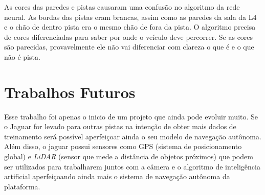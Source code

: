 As cores das paredes e pistas causaram uma confusão no algoritmo da rede neural. As bordas das pistas eram brancas, assim como as paredes da sala da L4 e o chão de dentro pista era o mesmo chão de fora da pista. O algoritmo precisa de cores diferenciadas para saber por onde o veículo deve percorrer. Se as cores são parecidas, provavelmente ele não vai diferenciar com clareza o que é e o que não é pista.

\section{Trabalhos Futuros}
\label{sec:trabalhos-futuros}

Esse trabalho foi apenas o inicio de um projeto que ainda pode evoluir muito. Se o Jaguar for levado para outras pistas na intenção de obter mais dados de treinamento será possível aperfeiçoar ainda o seu modelo de navegação autônoma. Além disso, o jaguar possui sensores como GPS  (sistema de posicionamento global) e \textit{LiDAR} (sensor que mede a distância de objetos próximos) que podem ser utilizados para trabalharem juntos com a câmera e o algoritmo de inteligência artificial aperfeiçoando ainda mais o sistema de navegação autônoma da plataforma.